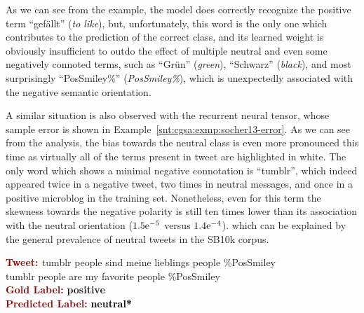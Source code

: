 As we can see from the example, the model does correctly recognize the
positive term ``gef\"allt'' (\emph{to like}), but, unfortunately, this
word is the only one which contributes to the prediction of the
correct class, and its learned weight is obviously insufficient to
outdo the effect of multiple neutral and even some negatively connoted
terms, such as ``Gr\"un'' (\emph{green}), ``Schwarz'' (\emph{black}),
and most surprisingly ``PosSmiley\%'' (\emph{PosSmiley\%}), which is
unexpectedly associated with the negative semantic orientation.

A similar situation is also observed with the recurrent neural tensor,
whose sample error is shown in
Example~\ref{snt:cgsa:exmp:socher13-error}.  As we can see from the
analysis, the bias towards the neutral class is even more pronounced
this time as virtually all of the terms present in tweet are
highlighted in white.  The only word which shows a minimal negative
connotation is ``tumblr'', which indeed appeared twice in a negative
tweet, two times in neutral messages, and once in a positive microblog
in the training set.  Nonetheless, even for this term the skewness
towards the negative polarity is still ten times lower than its
association with the neutral orientation (${1.5}\mathrm{e}^{-5}$ versus
${1.4}\mathrm{e}^{-4}$). which can be explained by the general
prevalence of neutral tweets in the SB10k corpus.

\begin{example}\label{snt:cgsa:exmp:socher13-error}
  \noindent\textup{\bfseries\textcolor{darkred}{Tweet: }} {\upshape
    \colorbox{blue!1.4!white!5}{tumblr} \colorbox{white!19}{people} \colorbox{white!32}{sind} \colorbox{white!5}{meine} \colorbox{white!30}{lieblings} \colorbox{white!19}{people} \colorbox{white!8}{\%PosSmiley}}\\
  \noindent \colorbox{blue!1.4!white!5}{tumblr} \colorbox{white!19}{people} \colorbox{white!32}{are} \colorbox{white!5}{my} \colorbox{white!30}{favorite} \colorbox{white!19}{people} \colorbox{white!8}{\%PosSmiley}\\[\exampleSep]
  \noindent\textup{\bfseries\textcolor{darkred}{Gold Label:}}\hspace*{4.3em}\textbf{%
    \upshape\textcolor{green3}{positive}}\\
 \noindent\textup{\bfseries\textcolor{darkred}{Predicted Label:}}\hspace*{2em}\textbf{%
    \upshape\textcolor{black}{neutral*}}
\end{example}

